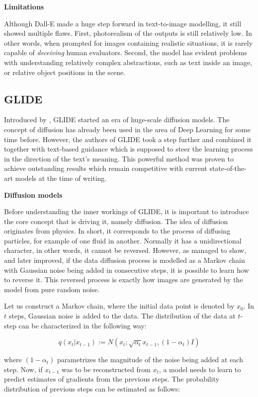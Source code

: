 \documentclass[
]{krantz}
\begin{document}
\textbf{Limitations}

Although Dall-E made a huge step forward in text-to-image modelling, it still showed multiple flaws. First, photorealism of the outputs is still relatively low. In other words, when prompted for images containing realistic situations, it is rarely capable of \emph{deceiving} human evaluators. Second, the model has evident problems with understanding relatively complex abstractions, such as text inside an image, or relative object positions in the scene.

\hypertarget{glide}{%
\subsection{GLIDE}\label{glide}}

Introduced by \citet{Glide2021}, GLIDE started an era of huge-scale diffusion models. The concept of diffusion has already been used in the area of Deep Learning for some time before. However, the authors of GLIDE took a step further and combined it together with text-based guidance which is supposed to steer the learning process in the direction of the text's meaning. This powerful method was proven to achieve outstanding results which remain competitive with current state-of-the-art models at the time of writing.

\textbf{Diffusion models}

Before understanding the inner workings of GLIDE, it is important to introduce the core concept that is driving it, namely diffusion. The idea of diffusion originates from physics. In short, it corresponds to the process of diffusing particles, for example of one fluid in another. Normally it has a unidirectional character, in other words, it cannot be reversed. However, as \citet{Diffusion2015} managed to show, and \citet{DenoisingDiffusion2020} later improved, if the data diffusion process is modelled as a Markov chain with Gaussian noise being added in consecutive steps, it is possible to learn how to reverse it. This reversed process is exactly how images are generated by the model from pure random noise.

Let us construct a Markov chain, where the initial data point is denoted by \(x_{0}\). In \(t\) steps, Gaussian noise is added to the data. The distribution of the data at \(t\)-step can be characterized in the following way:

\[q(x_{t}|x_{t-1}):=N(x_{t};\sqrt{\alpha_{t}}x_{t-1},(1-\alpha_{t})I)\]

where \((1-\alpha_{t})\) parametrizes the magnitude of the noise being added at each step. Now, if \(x_{t-1}\) was to be reconstructed from \(x_{t}\), a model needs to learn to predict estimates of gradients from the previous steps. The probability distribution of previous steps can be estimated as follows:
\end{document}
